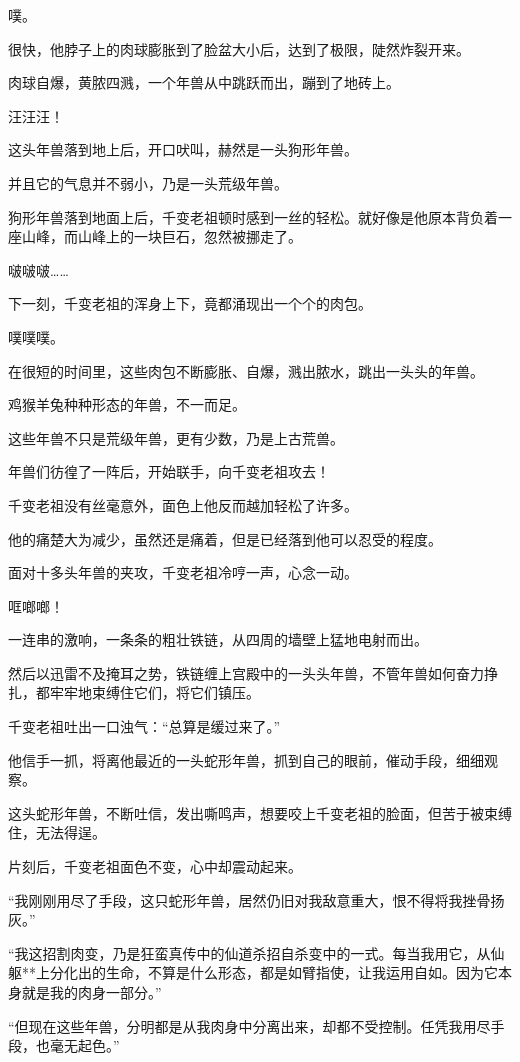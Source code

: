 \begin{this_body}
噗。

很快，他脖子上的肉球膨胀到了脸盆大小后，达到了极限，陡然炸裂开来。

肉球自爆，黄脓四溅，一个年兽从中跳跃而出，蹦到了地砖上。

汪汪汪！

这头年兽落到地上后，开口吠叫，赫然是一头狗形年兽。

并且它的气息并不弱小，乃是一头荒级年兽。

狗形年兽落到地面上后，千变老祖顿时感到一丝的轻松。就好像是他原本背负着一座山峰，而山峰上的一块巨石，忽然被挪走了。

啵啵啵……

下一刻，千变老祖的浑身上下，竟都涌现出一个个的肉包。

噗噗噗。

在很短的时间里，这些肉包不断膨胀、自爆，溅出脓水，跳出一头头的年兽。

鸡猴羊兔种种形态的年兽，不一而足。

这些年兽不只是荒级年兽，更有少数，乃是上古荒兽。

年兽们彷徨了一阵后，开始联手，向千变老祖攻去！

千变老祖没有丝毫意外，面色上他反而越加轻松了许多。

他的痛楚大为减少，虽然还是痛着，但是已经落到他可以忍受的程度。

面对十多头年兽的夹攻，千变老祖冷哼一声，心念一动。

哐啷啷！

一连串的激响，一条条的粗壮铁链，从四周的墙壁上猛地电射而出。

然后以迅雷不及掩耳之势，铁链缠上宫殿中的一头头年兽，不管年兽如何奋力挣扎，都牢牢地束缚住它们，将它们镇压。

千变老祖吐出一口浊气：“总算是缓过来了。”

他信手一抓，将离他最近的一头蛇形年兽，抓到自己的眼前，催动手段，细细观察。

这头蛇形年兽，不断吐信，发出嘶鸣声，想要咬上千变老祖的脸面，但苦于被束缚住，无法得逞。

片刻后，千变老祖面色不变，心中却震动起来。

“我刚刚用尽了手段，这只蛇形年兽，居然仍旧对我敌意重大，恨不得将我挫骨扬灰。”

“我这招割肉变，乃是狂蛮真传中的仙道杀招自杀变中的一式。每当我用它，从仙躯**上分化出的生命，不算是什么形态，都是如臂指使，让我运用自如。因为它本身就是我的肉身一部分。”

“但现在这些年兽，分明都是从我肉身中分离出来，却都不受控制。任凭我用尽手段，也毫无起色。”


\end{this_body}
